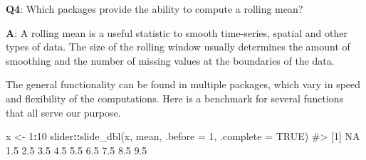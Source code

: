 \documentclass[
]{krantz}
\makeatletter
\newenvironment{Shaded}{\begin{snugshade}}{\end{snugshade}}
\newcommand{\CommentTok}[1]{\textcolor[rgb]{0.56,0.35,0.01}{\textit{#1}}}
\newcommand{\DataTypeTok}[1]{\textcolor[rgb]{0.13,0.29,0.53}{#1}}
\newcommand{\DecValTok}[1]{\textcolor[rgb]{0.00,0.00,0.81}{#1}}
\newcommand{\KeywordTok}[1]{\textcolor[rgb]{0.13,0.29,0.53}{\textbf{#1}}}
\newcommand{\NormalTok}[1]{#1}
\newcommand{\OperatorTok}[1]{\textcolor[rgb]{0.81,0.36,0.00}{\textbf{#1}}}
\newcommand{\OtherTok}[1]{\textcolor[rgb]{0.56,0.35,0.01}{#1}}
\newcommand{\StringTok}[1]{\textcolor[rgb]{0.31,0.60,0.02}{#1}}
\newenvironment{kframe}{%
\medskip{}
\setlength{\fboxsep}{.8em}
 \def\at@end@of@kframe{}%
 \ifinner\ifhmode%
  \def\at@end@of@kframe{\end{minipage}}%
  \begin{minipage}{\columnwidth}%
 \fi\fi%
 \def\FrameCommand##1{\hskip\@totalleftmargin \hskip-\fboxsep
 \colorbox{shadecolor}{##1}\hskip-\fboxsep
     \hskip-\linewidth \hskip-\@totalleftmargin \hskip\columnwidth}%
 \MakeFramed {\advance\hsize-\width
   \@totalleftmargin\z@ \linewidth\hsize
   \@setminipage}}%
 {\par\unskip\endMakeFramed%
 \at@end@of@kframe}
\renewenvironment{Shaded}{\begin{kframe}}{\end{kframe}}
\renewcommand{\KeywordTok} [1]{\textcolor[rgb]{0.00,0.44,0.13}{{#1}}}
\renewcommand{\DataTypeTok}[1]{\textcolor[rgb]{0.56,0.13,0.00}{{#1}}}
\renewcommand{\DecValTok}  [1]{\textcolor[rgb]{0.25,0.63,0.44}{{#1}}}
\renewcommand{\StringTok}  [1]{\textcolor[rgb]{0.25,0.44,0.63}{{#1}}}
\renewcommand{\CommentTok} [1]{\textcolor[rgb]{0.38,0.63,0.69}{{#1}}}
\renewcommand{\OtherTok}   [1]{\textcolor[rgb]{0.00,0.44,0.13}{{#1}}}
\renewcommand{\NormalTok}  [1]{{#1}}
\makeatother
\begin{document}
\textbf{{Q4}}: Which packages provide the ability to compute a rolling mean?

\textbf{{A}}: A rolling mean is a useful statistic to smooth time-series, spatial and other types of data. The size of the rolling window usually determines the amount of smoothing and the number of missing values at the boundaries of the data.

The general functionality can be found in multiple packages, which vary in speed and flexibility of the computations. Here is a benchmark for several functions that all serve our purpose.

\begin{Shaded}
\begin{Highlighting}[]
\NormalTok{x <-}\StringTok{ }\DecValTok{1}\OperatorTok{:}\DecValTok{10}
\NormalTok{slider}\OperatorTok{::}\KeywordTok{slide_dbl}\NormalTok{(x, mean, }\DataTypeTok{.before =} \DecValTok{1}\NormalTok{, }\DataTypeTok{.complete =} \OtherTok{TRUE}\NormalTok{)}
\CommentTok{#>  [1]  NA 1.5 2.5 3.5 4.5 5.5 6.5 7.5 8.5 9.5}


\end{Highlighting}
\end{Shaded}
\end{document}
